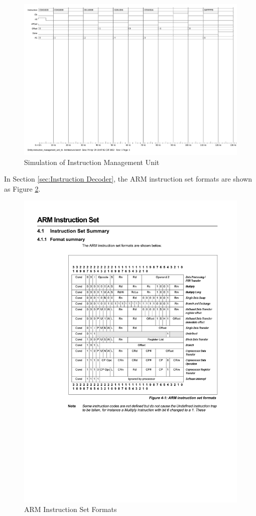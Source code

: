 \documentclass[12pt,a4paper]{article}
\begin{document}
\begin{figure}[htp]
  \centering
  \includegraphics[width=1.5\textwidth, angle=270]{picture/ModelSim_ insmanagement_tb(bench).pdf}
  \caption{Simulation of Instruction Management Unit}     
  \label{fig:ModelSim_ insmanagement_tb(bench)}
\end{figure}

In Section \ref{sec:Instruction Decoder}, the ARM instruction set formats are shown as Figure \ref{fig:AISF}.

\begin{figure}[htp]
  \centering
  \includegraphics[width=1\textwidth]{picture/ARM instruction set formats.pdf}
  \caption{ARM Instruction Set Formats}     
  \label{fig:AISF}
\end{figure}
\end{document}
